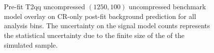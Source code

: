 \begin{figure}[!h]
{        \label{fig:T2qq_8fold_uncompressed_MR_4j}
    } \\
     ~~
     \\
    \caption{
        Pre-fit T2qq uncompressed $(1250,100)$ uncompressed benchmark model
        overlay on CR-only post-fit background prediction for all analysis bins.
        The uncertainty on the signal model counts represents the statistical
        uncertainty due to the finite size of the of the simulated sample.
    }
    \label{fig:T2qq_8fold_uncompressed_MR}
\end{figure}

